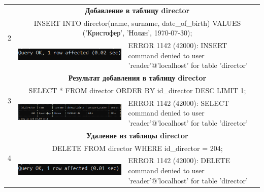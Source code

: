 \documentclass[11pt,a4paper,final]{article} %
\begin{document}
\begin{table}[H]
\begin{tabularx}{\textwidth}{|c|X|X|}
	
	\multirow{3}{*}{2} & \multicolumn{2}{c|}{\textbf{Добавление в таблицу director}}\\
	& \multicolumn{2}{c|}{\parbox{0.85\linewidth}{INSERT INTO director(name, surname, date\_of\_birth) VALUES ('Кристофер', 'Нолан', 1970-07-30);}} \\
	\cline{2-3}
	& 
	\vspace{-6pt}
	\hspace{-8.5pt}
	\includegraphics[width=1\linewidth]{e2.png}
	& 
	\vspace{-6pt}
	\hspace{-8.5pt}
	ERROR 1142 (42000): INSERT command denied to user 'reader'@'localhost' for table 'director'
	\\
	\cline{1-3}
	
	\multirow{3}{*}{3} & \multicolumn{2}{c|}{\textbf{Результат добавления в таблицу director}}\\
	& \multicolumn{2}{c|}{SELECT * FROM director ORDER BY id\_director DESC LIMIT 1;} \\
	\cline{2-3}
	& 
	\vspace{-6pt}
	\hspace{-8.5pt}
	\includegraphics[width=1\linewidth]{n2.png}
	& 
	\vspace{-6pt}
	\hspace{-8.5pt}
	ERROR 1142 (42000): SELECT command denied to user 'reader'@'localhost' for table 'director'
	\\
	\cline{1-3}
	
	
	\multirow{3}{*}{4} & \multicolumn{2}{c|}{\textbf{Удаление из таблицы director}}\\
	& \multicolumn{2}{c|}{DELETE FROM director WHERE id\_director = 204;} \\
	\cline{2-3}
	& 
	\vspace{-6pt}
	\hspace{-8.5pt}
	\includegraphics[width=1\linewidth]{e3.png}
	& 
	\vspace{-6pt}
	\hspace{-8.5pt}
	ERROR 1142 (42000): DELETE command denied to user 'reader'@'localhost' for table 'director'
	\\
	\cline{1-3}
	

\end{tabularx}
\end{table}
\end{document}
